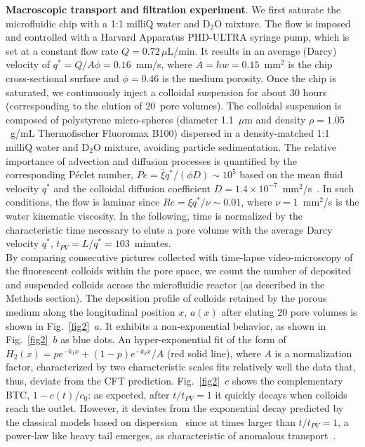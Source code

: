 \documentclass[singlecolumn,pre,notitlepage,preprintnumbers,floatfix,superscriptaddress]{revtex4-1}
\begin{document}
\noindent
\textbf{Macroscopic transport and filtration experiment}.
We first saturate the microfluidic chip with a 1:1 milliQ water and D$_2$O mixture. The flow is imposed and controlled with a Harvard Apparatus PHD-ULTRA syringe pump, which is set at a constant flow rate $Q = 0.72 \, \mu$L/min. It results in an average (Darcy) velocity of $q^{\ast} = Q/A \phi = 0.16$~mm/s, where $A = h w = 0.15$~mm$^2$ is the chip cross-sectional surface and $\phi = 0.46$ is the medium porosity. Once the chip is saturated, we continuously inject a colloidal suspension for about 30 hours (corresponding to the elution of 20~pore volumes). The colloidal suspension is composed of polystyrene micro-spheres (diameter 1.1~$\mu$m and density $\rho = 1.05$~g/mL Thermofischer Fluoromax B100) dispersed in a density-matched 1:1 milliQ water and D$_2$O mixture, avoiding particle sedimentation. The relative importance of advection and diffusion processes is quantified by the corresponding Péclet number, $Pe = \overline{\xi} q^{\ast} / (\phi D) \sim 10^5$ based on the mean fluid velocity $q^{\ast}$ and the colloidal diffusion coefficient $D = 1.4 × 10^{-7}$~mm$^2$/s~\cite{bordoloi_structure_2022}. In such conditions, the flow is laminar since $Re = \xi q^{\ast} / \nu \sim 0.01$, where $\nu = 1$~mm$^2$/s is the water kinematic viscosity. In the following, time is normalized by the characteristic time necessary to elute a pore volume with the average Darcy velocity $q^{\ast}$, $t_{PV} = L/q^{\ast} = 103$~minutes.\\
\noindent
By comparing consecutive pictures collected with time-lapse video-microscopy of the fluorescent colloids within the pore space, we count the number of deposited and suspended colloids across the microfluidic reactor (as described in the Methods section). The deposition profile of colloids retained by the porous medium along the longitudinal position $x$, $a(x)$ after eluting 20 pore volumes is shown in Fig.~\ref{fig2}~$a$. It exhibits a non-exponential behavior, as shown in Fig.~\ref{fig2}~$b$ as blue dots. An hyper-exponential fit of the form of $H_2(x) = pe^{-k_1x} + (1-p)e^{-k_2x}/A$ (red solid line), where $A$ is a normalization factor, characterized by two characteristic scales fits relatively well the data that, thus, deviate from the CFT prediction. Fig.~\ref{fig2}~$c$ shows the complementary BTC, $1-c(t)/c_0$: as expected, after $t/t_{PV} = 1$ it quickly decays when colloids reach the outlet. However, it deviates from the exponential decay predicted by the classical models based on dispersion~\cite{Dentz2011} since at times larger than $t/t_{PV}= 1$, a power-law like heavy tail emerges, as characteristic of anomalous transport~\cite{Berkowitz2006}. \\
\end{document}
